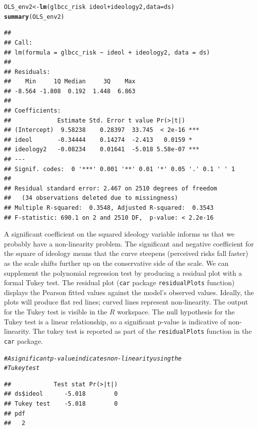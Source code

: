 \documentclass[11pt,openany]{book}\usepackage[]{graphicx}\usepackage[]{color}
\makeatletter
\newcommand{\hlcom}[1]{\textcolor[rgb]{0.678,0.584,0.686}{\textit{#1}}}%
\newcommand{\hlopt}[1]{\textcolor[rgb]{0,0,0}{#1}}%
\newcommand{\hlstd}[1]{\textcolor[rgb]{0.345,0.345,0.345}{#1}}%
\newcommand{\hlkwb}[1]{\textcolor[rgb]{0.69,0.353,0.396}{#1}}%
\newcommand{\hlkwc}[1]{\textcolor[rgb]{0.333,0.667,0.333}{#1}}%
\newcommand{\hlkwd}[1]{\textcolor[rgb]{0.737,0.353,0.396}{\textbf{#1}}}%
\newenvironment{kframe}{%
 \def\at@end@of@kframe{}%
 \ifinner\ifhmode%
  \def\at@end@of@kframe{\end{minipage}}%
  \begin{minipage}{\columnwidth}%
 \fi\fi%
 \def\FrameCommand##1{\hskip\@totalleftmargin \hskip-\fboxsep
 \colorbox{shadecolor}{##1}\hskip-\fboxsep
     \hskip-\linewidth \hskip-\@totalleftmargin \hskip\columnwidth}%
 \MakeFramed {\advance\hsize-\width
   \@totalleftmargin\z@ \linewidth\hsize
   \@setminipage}}%
 {\par\unskip\endMakeFramed%
 \at@end@of@kframe}
\newenvironment{knitrout}{}{} %
\renewenvironment{knitrout}{\begin{singlespace}}{\end{singlespace}}
\makeatother
\begin{document}
\begin{knitrout}
\color{fgcolor}\begin{kframe}
\begin{alltt}
\hlstd{OLS_env2} \hlkwb{<-} \hlkwd{lm}\hlstd{(glbcc_risk} \hlopt{~} \hlstd{ideol} \hlopt{+} \hlstd{ideology2,} \hlkwc{data} \hlstd{= ds)}
\hlkwd{summary}\hlstd{(OLS_env2)}
\end{alltt}
\begin{verbatim}
## 
## Call:
## lm(formula = glbcc_risk ~ ideol + ideology2, data = ds)
## 
## Residuals:
##    Min     1Q Median     3Q    Max 
## -8.564 -1.808  0.192  1.448  6.863 
## 
## Coefficients:
##             Estimate Std. Error t value Pr(>|t|)    
## (Intercept)  9.58238    0.28397  33.745  < 2e-16 ***
## ideol       -0.34444    0.14274  -2.413   0.0159 *  
## ideology2   -0.08234    0.01641  -5.018 5.58e-07 ***
## ---
## Signif. codes:  0 '***' 0.001 '**' 0.01 '*' 0.05 '.' 0.1 ' ' 1
## 
## Residual standard error: 2.467 on 2510 degrees of freedom
##   (34 observations deleted due to missingness)
## Multiple R-squared:  0.3548,	Adjusted R-squared:  0.3543 
## F-statistic: 690.1 on 2 and 2510 DF,  p-value: < 2.2e-16
\end{verbatim}
\end{kframe}
\end{knitrout}
A significant coefficient on the squared ideology variable informs us that we probably have a non-linearity problem. The significant and negative coefficient for the square of ideology means that the curve steepens (perceived risks fall faster) as the scale shifts further up on the conservative side of the scale. We can supplement the polynomial regression test by producing a residual plot with a formal Tukey test. The residual plot (\texttt{car} package \texttt{residualPlots} function) displays the Pearson fitted values against the model's observed values. Ideally, the plots will produce flat red lines; curved lines represent non-linearity.  The output for the Tukey test is visible in the $R$ workspace.  The null hypothesis for the Tukey test is a linear relationship, so a significant p-value is indicative of non-linearity.  The tukey test is reported as part of the \texttt{residualPlots} function in the \texttt{car} package.

\begin{knitrout}
\color{fgcolor}\begin{kframe}
\begin{alltt}
\hlcom{# A significant p-value indicates non-linearity using the}
\hlcom{# Tukey test}
\end{alltt}
\begin{verbatim}
##            Test stat Pr(>|t|)
## ds$ideol      -5.018        0
## Tukey test    -5.018        0
## pdf 
##   2
\end{verbatim}
\end{kframe}
\end{knitrout}
\end{document}
